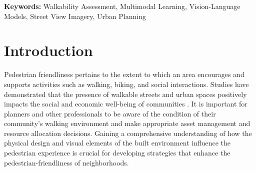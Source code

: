 \documentclass[11pt]{article}
\begin{document}
\textbf{Keywords:} Walkability Assessment, Multimodal Learning, Vision-Language Models, Street View Imagery, Urban Planning 

\section{Introduction}
Pedestrian friendliness pertains to the extent to which an area encourages and supports activities such as walking, biking, and social interactions. Studies have demonstrated that the presence of walkable streets and urban spaces positively impacts the social and economic well-being of communities \citep{ma2023quantitative}. It is important for planners and other professionals to be aware of the condition of their community’s walking environment and make appropriate asset management and resource allocation decisions. Gaining a comprehensive understanding of how the physical design and visual elements of the built environment influence the pedestrian experience is crucial for developing strategies that enhance the pedestrian-friendliness of neighborhoods. 
\end{document}

